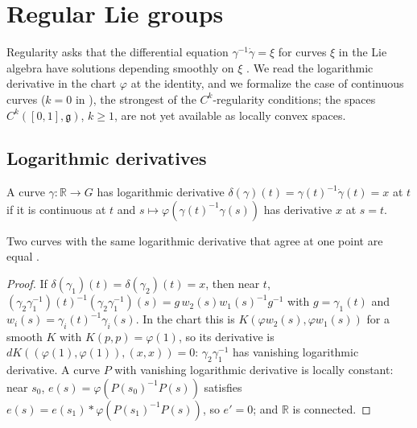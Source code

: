\chapter{Regular Lie groups}
\label{chap:regular}

Regularity asks that the differential equation $\gamma^{-1}\dot\gamma = \xi$ for curves
$\xi$ in the Lie algebra have solutions depending smoothly on $\xi$ \cite[Chapter 6]{GN26}. We
read the logarithmic derivative in the chart $\varphi$ at the identity, and we formalize the
case of continuous curves ($k = 0$ in \cite[Definition 6.1.1]{GN26}), the strongest of the
$C^k$-regularity conditions; the spaces $C^k([0, 1], \mathfrak g)$, $k \geq 1$, are not yet
available as locally convex spaces.

\section{Logarithmic derivatives}

\begin{definition}
  \label{def:log-deriv}
  \leanok
  A curve $\gamma\colon \mathbb{R} \to G$ has logarithmic derivative
  $\delta(\gamma)(t) = \gamma(t)^{-1}\dot\gamma(t) = x$ at $t$ if it is continuous at $t$ and
  $s \mapsto \varphi(\gamma(t)^{-1}\gamma(s))$ has derivative $x$ at $s = t$.
\end{definition}

\begin{lemma}
  \label{lem:log-deriv-unique}
  \leanok
  Two curves with the same logarithmic derivative that agree at one point are equal
  \cite[Lemma 5.5.4]{GN26}.
\end{lemma}

\begin{proof}
  \leanok
  If $\delta(\gamma_1)(t) = \delta(\gamma_2)(t) = x$, then near $t$,
  $(\gamma_2\gamma_1^{-1})(t)^{-1}(\gamma_2\gamma_1^{-1})(s) = g\, w_2(s) w_1(s)^{-1} g^{-1}$ with
  $g = \gamma_1(t)$ and $w_i(s) = \gamma_i(t)^{-1}\gamma_i(s)$. In the chart this is
  $K(\varphi w_2(s), \varphi w_1(s))$ for a smooth $K$ with $K(p, p) = \varphi(1)$, so its
  derivative is $dK((\varphi(1), \varphi(1)), (x, x)) = 0$: $\gamma_2\gamma_1^{-1}$ has vanishing
  logarithmic derivative. A curve $P$ with vanishing logarithmic derivative is locally constant:
  near $s_0$, $e(s) = \varphi(P(s_0)^{-1}P(s))$ satisfies
  $e(s) = e(s_1) * \varphi(P(s_1)^{-1}P(s))$, so $e' = 0$; and $\mathbb{R}$ is connected.
\end{proof}


